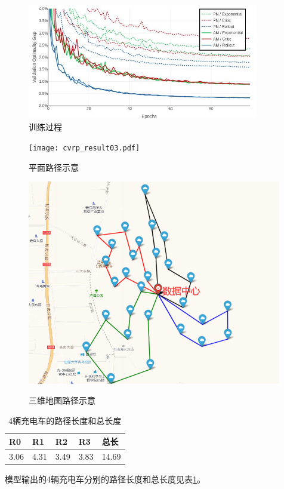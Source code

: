 \documentclass{whutmod}
\begin{document}
\begin{figure}[!h]
	\centering
	\includegraphics[width=0.9\textwidth]{trainprocess.jpg}
	\caption{训练过程}
	\label{fig:trainprocess}%
\end{figure}
\begin{figure}[H]
	\begin{minipage}[t]{0.45\textwidth}
		\centering
		\texttt{[image: cvrp\_result03.pdf]}	
		\label{fig:cvrp_result03_1}
           \caption{平面路径示意}
	\end{minipage}
	\qquad
	\begin{minipage}[t]{0.45\textwidth}
		\centering
		\includegraphics[width=0.99\textwidth]{cvrp_result03.png}
		\label{fig:cvrp_result03_2}
          \caption{三维地图路径示意}	
	\end{minipage}
\end{figure}

\begin{table}[htbp]
	\centering
	\caption{4辆充电车的路径长度和总长度}
	  \begin{tabular}{rrrrr}
	  \toprule
	  \multicolumn{1}{l}{R0} & \multicolumn{1}{l}{R1} & \multicolumn{1}{l}{R2} & \multicolumn{1}{l}{R3} & \multicolumn{1}{l}{总长} \\
	  \midrule
	  3.06  & 4.31  & 3.49  & 3.83  & 14.69 \\
	  \bottomrule
	  \end{tabular}%
	\label{tab:cvrp_result03}%
  \end{table}%
模型输出的4辆充电车分别的路径长度和总长度见表\ref{tab:cvrp_result03}。
\end{document}
